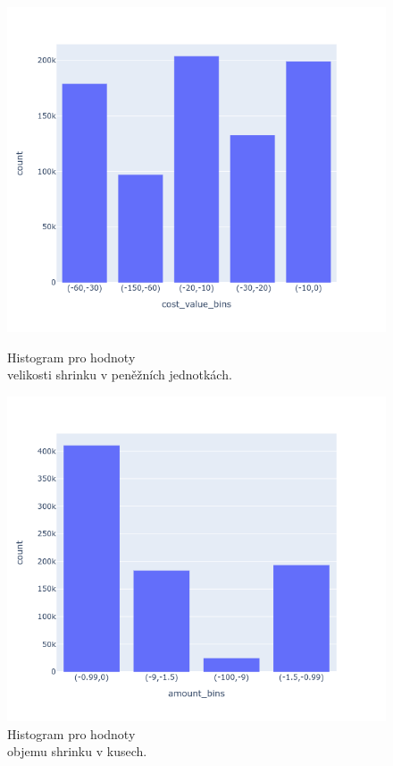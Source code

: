 \begin{figure}[h!]
    \centering
    \begin{minipage}[b]{.55\textwidth}
      \centering
      \captionsetup{justification=centering}

      \includegraphics[width=\textwidth]{obrazky/grafy/histogram/newplot(2).png}
      \vspace*{-3em}
      \caption{Histogram pro hodnoty \\ velikosti shrinku v peněžních jednotkách.}
      \label{obr:nb:hist}
    \end{minipage}%
    \hspace*{-2em}
    \begin{minipage}[b]{.55\textwidth}
        \centering
        \captionsetup{justification=centering}
        \includegraphics[width=\textwidth]{obrazky/grafy/histogram/newplot(1).png}
        \vspace*{-3em}
        \caption{Histogram pro hodnoty \\ objemu shrinku v kusech.}
        \label{obr:nb:hist2}
    \end{minipage}
    \vspace*{-2em}


\end{figure}
